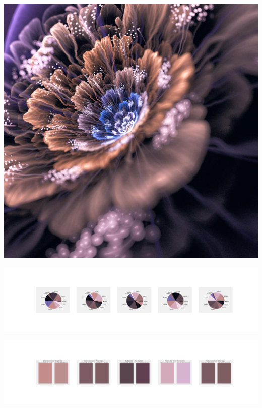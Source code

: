 \documentclass[11pt]{article}
\begin{document}
\begin{landscape}
    \begin{center}
    \includegraphics[width=\textwidth]{./nbimg/file (125).jpg}
    \end{center}

    \begin{center}
    \includegraphics[width=250mm]{./nbimg/pie-29.jpg}
    \end{center}

    \begin{center}
    \includegraphics[width=250mm]{./nbimg/peak-29.jpg}
    \end{center}
    


\end{landscape}
\end{document}
